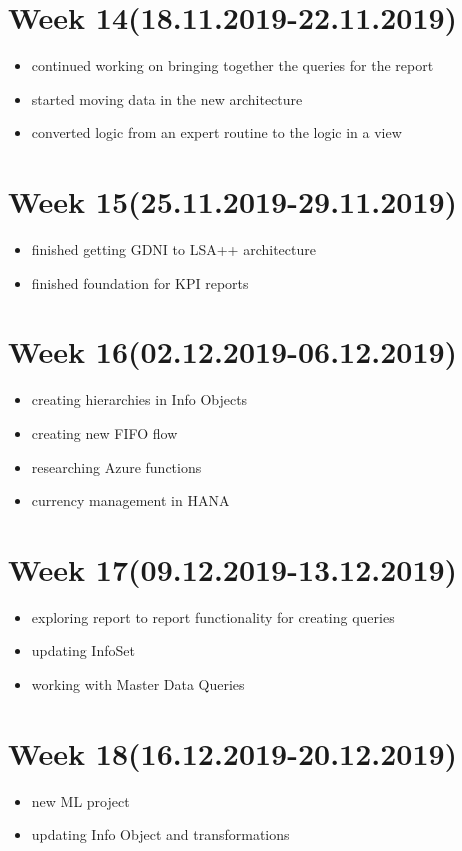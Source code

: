\documentclass{article}
\begin{document}
	\section{Week 14(18.11.2019-22.11.2019)}
	\begin{itemize}
		\item continued working on bringing together the queries for the report
		\item started moving data in the new architecture
		\item converted logic from an expert routine to the logic in a view
	\end{itemize}

	\section{Week 15(25.11.2019-29.11.2019)}
	\begin{itemize}
		\item finished getting GDNI to LSA++ architecture
		\item finished foundation for KPI reports
	\end{itemize}

	\section{Week 16(02.12.2019-06.12.2019)}
	\begin{itemize}
		\item creating hierarchies in Info Objects
		\item creating new FIFO flow
		\item researching Azure functions
		\item currency management in HANA
	\end{itemize}

	\section{Week 17(09.12.2019-13.12.2019)}
	\begin{itemize}
		\item exploring report to report functionality for creating queries
		\item updating InfoSet
		\item working with Master Data Queries
	\end{itemize}

	\section{Week 18(16.12.2019-20.12.2019)}
	\begin{itemize}
		\item new ML project
		\item updating Info Object and transformations
	\end{itemize}
\end{document}
